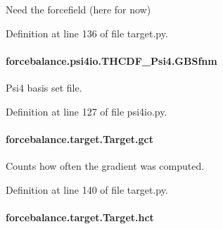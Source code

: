 Need the forcefield (here for now) 



Definition at line 136 of file target.\-py.

\hypertarget{classforcebalance_1_1psi4io_1_1THCDF__Psi4_ab406b703826e225ec1e1bb174faf0537}{
\paragraph[{G\-B\-Sfnm}]{\setlength{\rightskip}{0pt plus 5cm}forcebalance.\-psi4io.\-T\-H\-C\-D\-F\-\_\-\-Psi4.\-G\-B\-Sfnm}}\label{classforcebalance_1_1psi4io_1_1THCDF__Psi4_ab406b703826e225ec1e1bb174faf0537}


Psi4 basis set file. 



Definition at line 127 of file psi4io.\-py.

\hypertarget{classforcebalance_1_1target_1_1Target_aa625ac88c6744eb14ef281d9496d0dbb}{
\paragraph[{gct}]{\setlength{\rightskip}{0pt plus 5cm}forcebalance.\-target.\-Target.\-gct\hspace{0.3cm}{\ttfamily [inherited]}}}\label{classforcebalance_1_1target_1_1Target_aa625ac88c6744eb14ef281d9496d0dbb}


Counts how often the gradient was computed. 



Definition at line 140 of file target.\-py.

\hypertarget{classforcebalance_1_1target_1_1Target_a5b5a42f78052b47f29ed4b940c6111a1}{
\paragraph[{hct}]{\setlength{\rightskip}{0pt plus 5cm}forcebalance.\-target.\-Target.\-hct\hspace{0.3cm}{\ttfamily [inherited]}}}\label{classforcebalance_1_1target_1_1Target_a5b5a42f78052b47f29ed4b940c6111a1}


